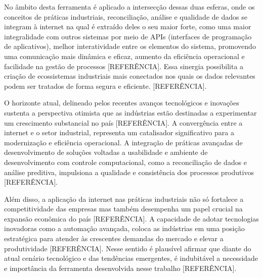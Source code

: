 No âmbito desta ferramenta é aplicado a intersecção dessas duas esferas, onde os conceitos de práticas industriais, reconciliação, análise e qualidade de dados se integram à internet na qual é extraído deles o seu maior forte, como uma maior integralidade com outros sistemas por meio de APIs (interfaces de programação de aplicativos), melhor interatividade entre os elementos do sistema, promovendo uma comunicação mais dinâmica e eficaz, aumento da eficiência operacional e facilidade na gestão de processos [REFERÊNCIA]. Essa sinergia possibilita a criação de ecossistemas industriais mais conectados nos quais os dados relevantes podem ser tratados de forma segura e eficiente. [REFERÊNCIA].

O horizonte atual, delineado pelos recentes avanços tecnológicos e inovações sustenta a perspectiva otimista que as indústrias estão destinadas a experimentar um crescimento substancial no país [REFERÊNCIA]. A convergência entre a internet e o setor industrial, representa um catalisador significativo para a modernização e eficiência operacional. A integração de práticas avançadas de desenvolvimento de soluções voltadas a usabilidade e ambiente de desenvolvimento com controle computacional, como a reconciliação de dados e análise preditiva, impulsiona a qualidade e consistência dos processos produtivos [REFERÊNCIA].

Além disso, a aplicação da internet nas práticas industriais não só fortalece a competitividade das empresas mas também desempenha um papel crucial na expansão econômica do país [REFERÊNCIA]. A capacidade de adotar tecnologias inovadoras como a automação avançada, coloca as indústrias em uma posição estratégica para atender às crescentes demandas do mercado e elevar a produtividade [REFERÊNCIA]. Nesse sentido é plausível afirmar que diante do atual cenário tecnológico e das tendências emergentes, é indubitável a necessidade e importância da ferramenta desenvolvida nesse trabalho [REFERÊNCIA].